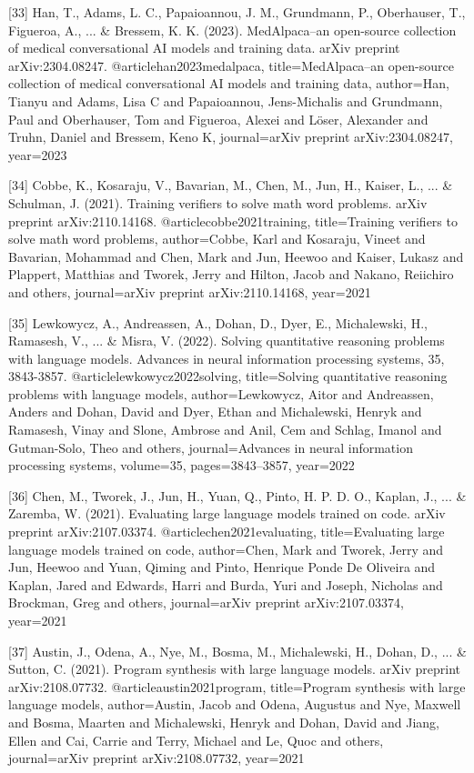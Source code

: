 \documentclass{article}
\begin{document}
{[33] Han, T., Adams, L. C., Papaioannou, J. M., Grundmann, P., Oberhauser, T., Figueroa, A., ... & Bressem, K. K. (2023). MedAlpaca--an open-source collection of medical conversational AI models and training data. arXiv preprint arXiv:2304.08247.
@article{han2023medalpaca,
  title={MedAlpaca--an open-source collection of medical conversational AI models and training data},
  author={Han, Tianyu and Adams, Lisa C and Papaioannou, Jens-Michalis and Grundmann, Paul and Oberhauser, Tom and Figueroa, Alexei and L{\"o}ser, Alexander and Truhn, Daniel and Bressem, Keno K},
  journal={arXiv preprint arXiv:2304.08247},
  year={2023}
}

[34] Cobbe, K., Kosaraju, V., Bavarian, M., Chen, M., Jun, H., Kaiser, L., ... & Schulman, J. (2021). Training verifiers to solve math word problems. arXiv preprint arXiv:2110.14168.
@article{cobbe2021training,
  title={Training verifiers to solve math word problems},
  author={Cobbe, Karl and Kosaraju, Vineet and Bavarian, Mohammad and Chen, Mark and Jun, Heewoo and Kaiser, Lukasz and Plappert, Matthias and Tworek, Jerry and Hilton, Jacob and Nakano, Reiichiro and others},
  journal={arXiv preprint arXiv:2110.14168},
  year={2021}
}


[35] Lewkowycz, A., Andreassen, A., Dohan, D., Dyer, E., Michalewski, H., Ramasesh, V., ... & Misra, V. (2022). Solving quantitative reasoning problems with language models. Advances in neural information processing systems, 35, 3843-3857.
@article{lewkowycz2022solving,
  title={Solving quantitative reasoning problems with language models},
  author={Lewkowycz, Aitor and Andreassen, Anders and Dohan, David and Dyer, Ethan and Michalewski, Henryk and Ramasesh, Vinay and Slone, Ambrose and Anil, Cem and Schlag, Imanol and Gutman-Solo, Theo and others},
  journal={Advances in neural information processing systems},
  volume={35},
  pages={3843--3857},
  year={2022}
}

[36] Chen, M., Tworek, J., Jun, H., Yuan, Q., Pinto, H. P. D. O., Kaplan, J., ... & Zaremba, W. (2021). Evaluating large language models trained on code. arXiv preprint arXiv:2107.03374.
@article{chen2021evaluating,
  title={Evaluating large language models trained on code},
  author={Chen, Mark and Tworek, Jerry and Jun, Heewoo and Yuan, Qiming and Pinto, Henrique Ponde De Oliveira and Kaplan, Jared and Edwards, Harri and Burda, Yuri and Joseph, Nicholas and Brockman, Greg and others},
  journal={arXiv preprint arXiv:2107.03374},
  year={2021}
}

[37] Austin, J., Odena, A., Nye, M., Bosma, M., Michalewski, H., Dohan, D., ... & Sutton, C. (2021). Program synthesis with large language models. arXiv preprint arXiv:2108.07732.
@article{austin2021program,
  title={Program synthesis with large language models},
  author={Austin, Jacob and Odena, Augustus and Nye, Maxwell and Bosma, Maarten and Michalewski, Henryk and Dohan, David and Jiang, Ellen and Cai, Carrie and Terry, Michael and Le, Quoc and others},
  journal={arXiv preprint arXiv:2108.07732},
  year={2021}
}

}
\end{document}
